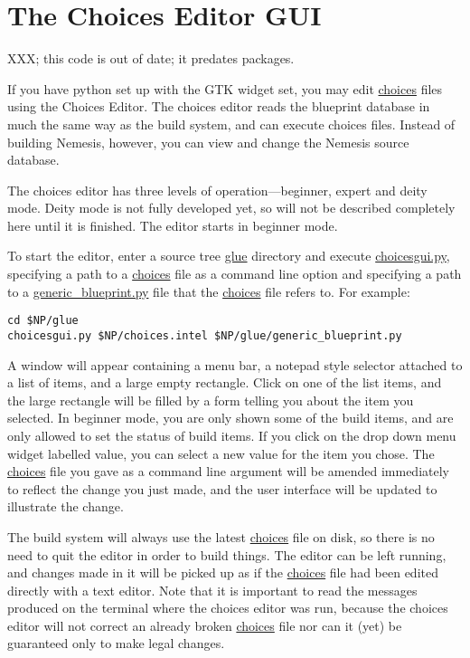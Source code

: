 \documentclass[a4paper]{article}
\begin{document}
\section{The Choices Editor GUI}

XXX; this code is out of date; it predates packages.

If you have python set up with the GTK widget set, you may edit
\url{choices} files using the Choices Editor. The choices editor reads
the blueprint database in much the same way as the build system, and
can execute choices files. Instead of building Nemesis, however, you
can view and change the Nemesis source database.

The choices editor has three levels of operation---beginner, expert and
deity mode. Deity mode is not fully developed yet, so will not be
described completely here until it is finished. The editor starts in
beginner mode. 

To start the editor, enter a source tree \url{glue} directory and
execute \url{choicesgui.py}, specifying a path to a \url{choices} file
as a command line option and specifying a path to a
\url{generic_blueprint.py} file that the \url{choices} file refers
to. For example:

\begin{verbatim}
cd $NP/glue
choicesgui.py $NP/choices.intel $NP/glue/generic_blueprint.py
\end{verbatim}

A window will appear containing a menu bar, a notepad style selector
attached to a list of items, and a large empty rectangle. Click on one
of the list items, and the large rectangle will be filled by a form
telling you about the item you selected. In beginner mode, you are
only shown some of the build items, and are only allowed to set the
status of build items. If you click on the drop down menu widget
labelled value, you can select a new value for the item you chose. The
\url{choices} file you gave as a command line argument will be
amended immediately to reflect the change you just made, and the user
interface will be updated to illustrate the change.

The build system will always use the latest \url{choices} file on
disk, so there is no need to quit the editor in order to build
things. The editor can be left running, and changes made in it will be
picked up as if the \url{choices} file had been edited directly with a
text editor.  Note that it is important to read the messages produced
on the terminal where the choices editor was run, because the choices
editor will not correct an already broken \url{choices} file nor can
it (yet) be guaranteed only to make legal changes.
\end{document}
